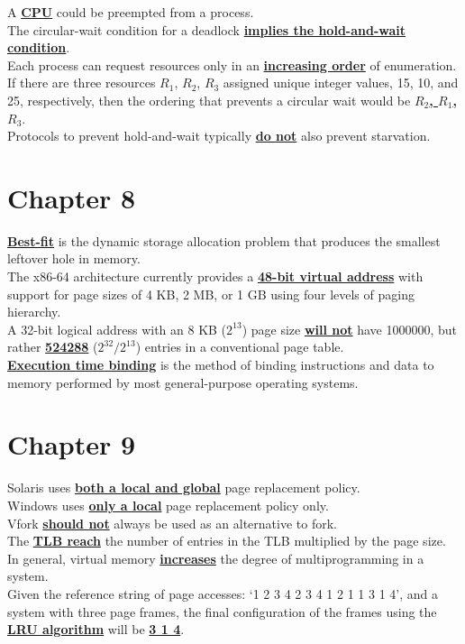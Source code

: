 \documentclass[10pt]{article}
\newcommand{\qw}[1]{\textbf{\ul{#1}}}
\begin{document}
A \qw{CPU} could be preempted from a process.\\[2mm]
The circular-wait condition for a deadlock \qw{implies the hold-and-wait condition}.\\[2mm]
Each process can request resources only in an \qw{increasing order} of enumeration. If there are three resources $R_1$, $R_2$, $R_3$ assigned unique integer values, 15, 10, and 25, respectively, then the ordering that prevents a circular wait would be \qw{$R_2$, $R_1$, $R_3$}.\\[2mm]
Protocols to prevent hold-and-wait typically \qw{do not} also prevent starvation.\\[2mm]


\newpage
\section*{\centering Chapter 8}
\qw{Best-fit} is the dynamic storage allocation problem that produces the smallest leftover hole in memory.\\[2mm]
The x86-64 architecture currently provides a \qw{48-bit virtual address} with support for page sizes of 4 KB, 2 MB, or 1 GB using four levels of paging hierarchy.\\[2mm]
A 32-bit logical address with an 8 KB ($2^{13}$) page size \qw{will not} have 1000000, but rather \qw{524288} ($2^{32}/2^{13}$) entries in a conventional page table.\\[2mm]
\qw{Execution time binding} is the method of binding instructions and data to memory performed by most general-purpose operating systems.\\[2mm]

\newpage
\section*{\centering Chapter 9}
Solaris uses \qw{both a local and global} page replacement policy.\\[2mm]
Windows uses \qw{only a local} page replacement policy only.\\[2mm]
Vfork \qw{should not} always be used as an alternative to fork.\\[2mm]
The \qw{TLB reach} the number of entries in the TLB multiplied by the page size.\\[2mm]
In general, virtual memory \qw{increases} the degree of multiprogramming in a system.\\[2mm]
Given the reference string of page accesses: `1 2 3 4 2 3 4 1 2 1 1 3 1 4', and a system with three page frames, the final configuration of the frames using the \qw{LRU algorithm} will be \qw{3 1 4}.\\[2mm]
\end{document}

